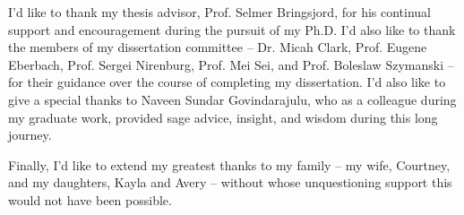  

I'd like to thank my thesis advisor, Prof. Selmer Bringsjord, for his continual support and encouragement during the pursuit of my Ph.D.  I'd also like to thank the members of my dissertation committee -- Dr. Micah Clark, Prof. Eugene Eberbach, Prof. Sergei Nirenburg, Prof. Mei Sei, and Prof. Boleslaw Szymanski -- for their guidance over the course of completing my dissertation.  I'd also like to give a special thanks to Naveen Sundar Govindarajulu, who as a colleague during my graduate work, provided sage advice, insight, and wisdom during this long journey.

Finally, I'd like to extend my greatest thanks to my family -- my wife, Courtney, and my daughters, Kayla and Avery -- without whose unquestioning support this would not have been possible.